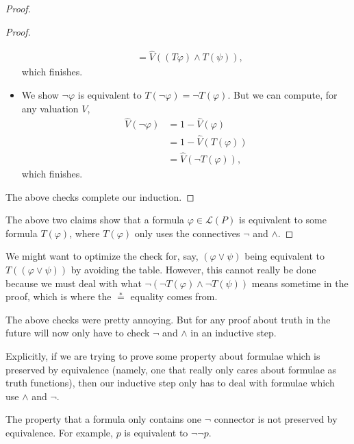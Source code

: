 \documentclass[../notes.tex]{subfiles}
\begin{document}
\begin{proof}
\begin{proof}
\begin{itemize}
\begin{align*}
				&= \hat V((T\varphi)\land T(\psi)),
			\end{align*}
			which finishes.
			\item We show $\lnot\varphi$ is equivalent to $T(\lnot\varphi)=\lnot T(\varphi)$. But we can compute, for any valuation $V$,
			\begin{align*}
				\hat V(\lnot\varphi) &= 1-\hat V(\varphi) \\
				&= 1-\hat V(T(\varphi)) \\
				&= \hat V(\lnot T(\varphi)),
			\end{align*}
			which finishes.
		\end{itemize}
		The above checks complete our induction.
	\end{proof}
	The above two claims show that a formula $\varphi\in\mathcal L(P)$ is equivalent to some formula $T(\varphi)$, where $T(\varphi)$ only uses the connectives $\lnot$ and $\land$.
\end{proof}
\begin{remark}
	We might want to optimize the check for, say, $(\varphi\lor\psi)$ being equivalent to $T((\varphi\lor\psi))$ by avoiding the table. However, this cannot really be done because we must deal with what $\lnot(\lnot T(\varphi)\land\lnot T(\psi))$ means sometime in the proof, which is where the $\stackrel*=$ equality comes from.
\end{remark}
\begin{remark}
	The above checks were pretty annoying. But for any proof about truth in the future will now only have to check $\lnot$ and $\land$ in an inductive step.
\end{remark}
Explicitly, if we are trying to prove some property about formulae which is preserved by equivalence (namely, one that really only cares about formulae as truth functions), then our inductive step only has to deal with formulae which use $\land$ and $\lnot$.
\begin{nex}
	The property that a formula only contains one $\lnot$ connector is not preserved by equivalence. For example, $p$ is equivalent to $\lnot\lnot p$.
\end{nex}
\end{document}
